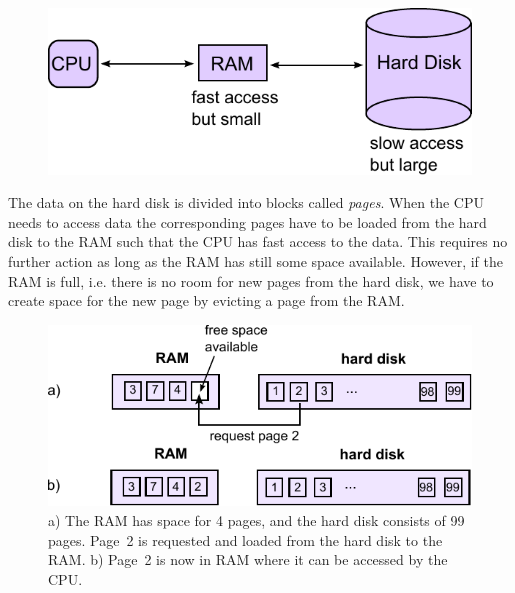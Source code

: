 \documentclass[a4paper,12pt, titlepage]{article}  %
\begin{document}
\begin{figure}[h]
\centering
\includegraphics[scale=0.7]{./figures/twoLevelMemory_CPU_RAM_HDD.pdf}
\end{figure}

The data on the hard disk is divided into blocks called \emph{pages}. When the CPU needs 
to access data the corresponding pages have to be loaded from the hard disk to the RAM such 
that the CPU has fast access to the data. This requires no further action as long as 
the RAM has still some space available. However, if the RAM is full, i.e. there is no room
for new pages from the hard disk, we have to create space for the new page by evicting a page 
from the RAM.

\begin{figure}[h]
\centering
\includegraphics[scale=1.0]{./figures/RAM_hdd_page_part1.pdf}
\caption{a) The RAM has space for 4 pages, and the hard disk consists of 99 pages. Page~2
is requested and loaded from the hard disk to the RAM. b) Page~2 is now in RAM where it can be
accessed by the CPU.}
\end{figure}
\end{document}
